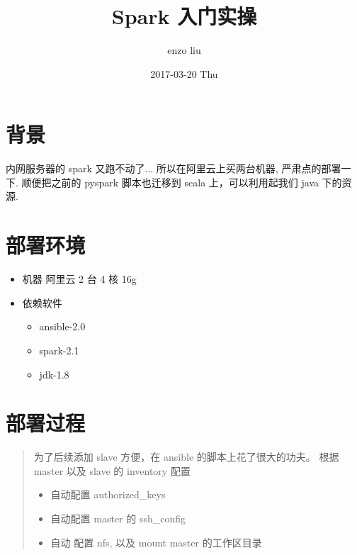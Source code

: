 \documentclass[11pt,a4paper]{article}
\author{enzo liu}
\date{2017-03-20 Thu}
\title{Spark 入门实操}
\begin{document}
\maketitle

\section*{背景}
\label{sec:org10de301}
内网服务器的 spark 又跑不动了... 所以在阿里云上买两台机器, 严肃点的部署一下.
顺便把之前的 pyspark 脚本也迁移到 scala 上，可以利用起我们 java 下的资源.

\section*{部署环境}
\label{sec:org09331f6}
\begin{itemize}
\item 机器
阿里云 2 台 4 核 16g
\item 依赖软件
\begin{itemize}
\item ansible-2.0
\item spark-2.1
\item jdk-1.8
\end{itemize}
\end{itemize}

\section*{部署过程}
\label{sec:org906de3e}
\begin{quote}
为了后续添加 slave 方便，在 ansible 的脚本上花了很大的功夫。
根据 master 以及 slave 的 inventory 配置
\begin{itemize}
\item 自动配置 authorized\_keys
\item 自动配置 master 的 ssh\_config
\item 自动 配置 nfs, 以及 mount master 的工作区目录
\end{itemize}
\end{quote}
\end{document}
